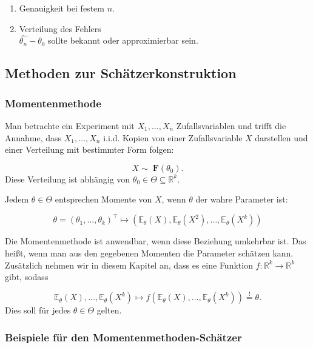 \documentclass[10pt]{article}
\newcommand{\FZV}{X_1, \ldots, X_n} %
\newcommand{\IR}{\mathbb{R}} %
\newcommand{\EW}{\mathbb{E}} %
\begin{document}
\begin{enumerate}
	\item Genauigkeit bei festem $n$.
	\item Verteilung des Fehlers\\
	$\hat{\theta_n}-\theta_0$ sollte bekannt oder approximierbar sein. 
	
\end{enumerate}

\subsection{Methoden zur Schätzerkonstruktion}
\subsubsection{Momentenmethode}

Man betrachte ein Experiment mit $\FZV$ Zufallsvariablen und trifft die Annahme, dass $\FZV$ i.i.d. Kopien von einer Zufallsvariable $X$ darstellen und einer Verteilung mit bestimmter Form folgen:

\vspace{-2mm}
\begin{equation*}
	X \sim \; \textbf{F}(\theta_0).
\end{equation*}
Diese Verteilung ist abhängig von $\theta_0 \in \Theta \subseteq \IR^k$.

\noindent Jedem $\theta \in \Theta$ entsprechen Momente von $X$, wenn $\theta$ der wahre Parameter ist: 

\begin{equation*}
	\theta = (\theta_1, \ldots, \theta_k)^\top \mapsto (\EW_\theta(X), \EW_\theta(X^2),\ldots,\EW_\theta(X^k))
\end{equation*}

\noindent Die Momentenmethode ist anwendbar, wenn diese Beziehung umkehrbar ist. Das heißt, wenn man aus den gegebenen Momenten die Parameter schätzen kann. Zusätzlich nehmen wir in diesem Kapitel an, dass es eine Funktion $f: \IR^k \rightarrow \IR^k$ gibt, sodass 

\begin{equation*}
	\EW_\theta(X),\ldots,\EW_\theta(X^k) \mapsto f(\EW_\theta(X),\ldots,\EW_\theta(X^k)) \overset{!}= \theta.
\end{equation*}
Dies soll für jedes $\theta \in \Theta$ gelten.

\subsubsection{Beispiele für den Momentenmethoden-Schätzer}
\end{document}

